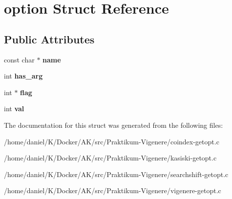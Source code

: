 \hypertarget{structoption}{}\section{option Struct Reference}
\label{structoption}
\subsection*{Public Attributes}
\begin{DoxyCompactItemize}
\item 
\mbox{\label{structoption_ae02f2d0cea6af34951d9008be8bfa625}} 
const char $\ast$ {\bfseries name}
\item 
\mbox{\label{structoption_a90d7ee9a51eea5c002682dbd0af149e4}} 
int {\bfseries has\+\_\+arg}
\item 
\mbox{\label{structoption_a24ad4639d5d498fdc1c5b38bcaabc263}} 
int $\ast$ {\bfseries flag}
\item 
\mbox{\label{structoption_a13bd155ec3b405d29c41ab8d0793be11}} 
int {\bfseries val}
\end{DoxyCompactItemize}


The documentation for this struct was generated from the following files\+:\begin{DoxyCompactItemize}
\item 
/home/daniel/\+K/\+Docker/\+A\+K/src/\+Praktikum-\/\+Vigenere/coindex-\/getopt.\+c\item 
/home/daniel/\+K/\+Docker/\+A\+K/src/\+Praktikum-\/\+Vigenere/kasiski-\/getopt.\+c\item 
/home/daniel/\+K/\+Docker/\+A\+K/src/\+Praktikum-\/\+Vigenere/searchshift-\/getopt.\+c\item 
/home/daniel/\+K/\+Docker/\+A\+K/src/\+Praktikum-\/\+Vigenere/vigenere-\/getopt.\+c\end{DoxyCompactItemize}
